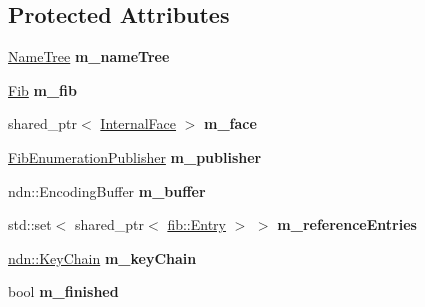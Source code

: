\subsection*{Protected Attributes}
\begin{DoxyCompactItemize}
\item 
\hyperlink{classnfd_1_1NameTree}{Name\+Tree} {\bfseries m\+\_\+name\+Tree}\hypertarget{classnfd_1_1tests_1_1FibEnumerationPublisherFixture_aa0d33dcf5660a44ac319dfcbd56b7fb8}{}\label{classnfd_1_1tests_1_1FibEnumerationPublisherFixture_aa0d33dcf5660a44ac319dfcbd56b7fb8}

\item 
\hyperlink{classnfd_1_1Fib}{Fib} {\bfseries m\+\_\+fib}\hypertarget{classnfd_1_1tests_1_1FibEnumerationPublisherFixture_afaa50c1583d27d204de4b77754543375}{}\label{classnfd_1_1tests_1_1FibEnumerationPublisherFixture_afaa50c1583d27d204de4b77754543375}

\item 
shared\+\_\+ptr$<$ \hyperlink{classnfd_1_1InternalFace}{Internal\+Face} $>$ {\bfseries m\+\_\+face}\hypertarget{classnfd_1_1tests_1_1FibEnumerationPublisherFixture_a20490200b3ebd33ece9a64e5dded9b58}{}\label{classnfd_1_1tests_1_1FibEnumerationPublisherFixture_a20490200b3ebd33ece9a64e5dded9b58}

\item 
\hyperlink{classnfd_1_1FibEnumerationPublisher}{Fib\+Enumeration\+Publisher} {\bfseries m\+\_\+publisher}\hypertarget{classnfd_1_1tests_1_1FibEnumerationPublisherFixture_ae85ad6299b29da171aa16977e8f901f4}{}\label{classnfd_1_1tests_1_1FibEnumerationPublisherFixture_ae85ad6299b29da171aa16977e8f901f4}

\item 
ndn\+::\+Encoding\+Buffer {\bfseries m\+\_\+buffer}\hypertarget{classnfd_1_1tests_1_1FibEnumerationPublisherFixture_a5b683b5bf795750876453323ed17ac8c}{}\label{classnfd_1_1tests_1_1FibEnumerationPublisherFixture_a5b683b5bf795750876453323ed17ac8c}

\item 
std\+::set$<$ shared\+\_\+ptr$<$ \hyperlink{classnfd_1_1fib_1_1Entry}{fib\+::\+Entry} $>$ $>$ {\bfseries m\+\_\+reference\+Entries}\hypertarget{classnfd_1_1tests_1_1FibEnumerationPublisherFixture_a358362d573fe3d96425b65f0cc2c2270}{}\label{classnfd_1_1tests_1_1FibEnumerationPublisherFixture_a358362d573fe3d96425b65f0cc2c2270}

\item 
\hyperlink{classndn_1_1security_1_1KeyChain}{ndn\+::\+Key\+Chain} {\bfseries m\+\_\+key\+Chain}\hypertarget{classnfd_1_1tests_1_1FibEnumerationPublisherFixture_aa5230d3e1170a16b7d2f3e4ae0b281cf}{}\label{classnfd_1_1tests_1_1FibEnumerationPublisherFixture_aa5230d3e1170a16b7d2f3e4ae0b281cf}

\item 
bool {\bfseries m\+\_\+finished}\hypertarget{classnfd_1_1tests_1_1FibEnumerationPublisherFixture_a99151eccfa119439a5182f51c5e55d4c}{}\label{classnfd_1_1tests_1_1FibEnumerationPublisherFixture_a99151eccfa119439a5182f51c5e55d4c}

\end{DoxyCompactItemize}


